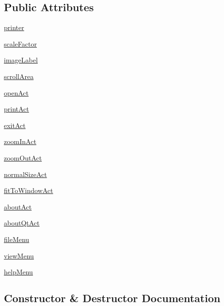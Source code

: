 \subsection*{Public Attributes}
\begin{DoxyCompactItemize}
\item 
\hyperlink{classimageviewer_1_1ImageViewer_a9bdb14df7dc3023c7465fe1f36c20459}{printer}
\item 
\hyperlink{classimageviewer_1_1ImageViewer_a581bd98d8b61f57abc2725adaf4e4053}{scale\+Factor}
\item 
\hyperlink{classimageviewer_1_1ImageViewer_a826699ff8f380c3709ea47195b680b75}{image\+Label}
\item 
\hyperlink{classimageviewer_1_1ImageViewer_a3f986289538498c0afe145e1890ac9c9}{scroll\+Area}
\item 
\hyperlink{classimageviewer_1_1ImageViewer_afef91cce074633eae39dec085673c1c8}{open\+Act}
\item 
\hyperlink{classimageviewer_1_1ImageViewer_a3d81be3f2a7db13210d1e0e6e27c92db}{print\+Act}
\item 
\hyperlink{classimageviewer_1_1ImageViewer_ab2cff1e31474fc73970e84331753b685}{exit\+Act}
\item 
\hyperlink{classimageviewer_1_1ImageViewer_ab573b4ead34e2669c38926b9bfdbf87b}{zoom\+In\+Act}
\item 
\hyperlink{classimageviewer_1_1ImageViewer_acab3c91b1789f258606f1071a49238dc}{zoom\+Out\+Act}
\item 
\hyperlink{classimageviewer_1_1ImageViewer_a7e19fa6fc1ced0785ea307d99db28a1f}{normal\+Size\+Act}
\item 
\hyperlink{classimageviewer_1_1ImageViewer_a1e0ee15bd4c983053741ab623e955cb5}{fit\+To\+Window\+Act}
\item 
\hyperlink{classimageviewer_1_1ImageViewer_a7d0d254c880734f5f5bf919d01307911}{about\+Act}
\item 
\hyperlink{classimageviewer_1_1ImageViewer_af9325f107ee0bffebc1dc89a8d16763a}{about\+Qt\+Act}
\item 
\hyperlink{classimageviewer_1_1ImageViewer_ae3c23bdfdacd19ad726b66bbe3c8437d}{file\+Menu}
\item 
\hyperlink{classimageviewer_1_1ImageViewer_a1bc91a67c3135cc6cbbd173bbff4edc7}{view\+Menu}
\item 
\hyperlink{classimageviewer_1_1ImageViewer_a36506bc20950d86480e882ac568f536a}{help\+Menu}
\end{DoxyCompactItemize}


\subsection{Constructor \& Destructor Documentation}
\hypertarget{classimageviewer_1_1ImageViewer_ac057a354980e0ba678efa121c509094f}{}
